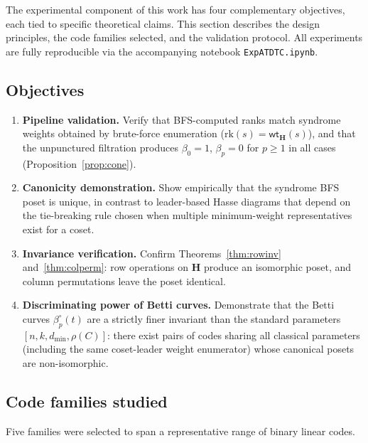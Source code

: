 \documentclass[11pt,twoside,leqno]{article}
\theoremstyle{definition}
\theoremstyle{plain}
\theoremstyle{remark}
\newcommand{\wt}{\mathsf{wt}}
\newcommand{\HH}{\mathbf{H}}
\newcommand{\covrad}{\rho}
\begin{document}
The experimental component of this work has four complementary objectives, each tied to specific
theoretical claims. This section describes the design principles, the code families selected, and
the validation protocol. All experiments are fully reproducible via the accompanying notebook
\texttt{ExpATDTC.ipynb}.

\subsection{Objectives}

\begin{enumerate}[leftmargin=*,itemsep=3pt]
\item \textbf{Pipeline validation.}
  Verify that BFS-computed ranks match syndrome weights obtained by brute-force enumeration
  ($\mathrm{rk}(s)=\wt_\HH(s)$), and that the unpunctured filtration produces $\beta_0=1$,
  $\beta_p=0$ for $p\ge 1$ in all cases (Proposition~\ref{prop:cone}).

\item \textbf{Canonicity demonstration.}
  Show empirically that the syndrome BFS poset is unique, in contrast to leader-based Hasse
  diagrams that depend on the tie-breaking rule chosen when multiple minimum-weight
  representatives exist for a coset.

\item \textbf{Invariance verification.}
  Confirm Theorems~\ref{thm:rowinv} and~\ref{thm:colperm}: row operations on $\HH$ produce an
  isomorphic poset, and column permutations leave the poset identical.

\item \textbf{Discriminating power of Betti curves.}
  Demonstrate that the Betti curves $\beta_p^\circ(t)$ are a strictly finer invariant than the
  standard parameters $[n,k,d_{\min},\covrad(C)]$: there exist pairs of codes sharing all
  classical parameters (including the same coset-leader weight enumerator) whose canonical
  posets are non-isomorphic.
\end{enumerate}

\subsection{Code families studied}

Five families were selected to span a representative range of binary linear codes.
\end{document}
